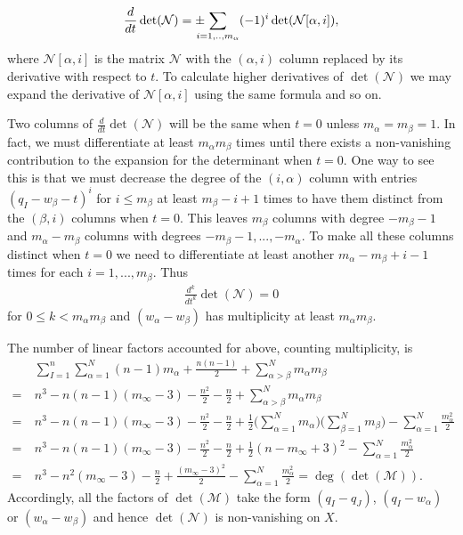 \documentclass[a4paper,12pt,reqno]{amsart}
\numberwithin{equation}{section}
\numberwithin{counter2}{section}
\begin{document}
\begin{align}
\frac{d}{dt}\det(\mathcal{N}) = \pm \hspace{-3mm} \sum_{i = 1,..,m_\alpha} (-1)^i \det(\mathcal{N}{[\alpha,i]}),  
\end{align}
where $\mathcal{N}{[\alpha,i]}$ is the matrix $\mathcal{N}$ with the $(\alpha,i)$ column replaced by its derivative with respect to $t$.  To calculate higher derivatives of $\det(\mathcal{N})$ we may expand the derivative of $\mathcal{N}{[\alpha,i]}$ using the same formula and so on.  \par 
Two columns of $\frac{d}{dt}\det(\mathcal{N})$ will be the same when $t = 0$ unless $m_\alpha = m_\beta = 1$.  In fact,  we must differentiate at least $m_\alpha m_\beta$ times until there exists a non-vanishing contribution to the expansion for the determinant when $t = 0$.  One way to see this is that we must decrease the degree of the $(i,\alpha)$ column with entries $(q_I - w_\beta - t)^i$ for $i \le m_\beta$ at least $m_\beta - i + 1$ times to have them distinct from the $(\beta,i)$ columns when $t = 0$.  This leaves $m_\beta$ columns with degree $-m_\beta - 1$ and $m_\alpha - m_\beta$ columns with degrees $-m_\beta - 1,...,-m_\alpha$.  To make all these columns distinct when $t = 0$ we need to differentiate at least another $m_\alpha - m_\beta + i - 1$ times for each $i = 1,...,m_\beta$.  Thus
\begin{align}
\frac{d^k}{dt^k}\det(\mathcal{N}) = 0
\end{align}
for $0 \le k < m_\alpha m_\beta$ and $(w_\alpha - w_\beta)$ has multiplicity at least $m_\alpha m_\beta$.   \par 
The number of linear factors accounted for above,  counting multiplicity,  is 
\begin{align}
&\sum_{I = 1}^{n} \sum_{\alpha = 1}^{N} (n-1)m_\alpha + \frac{n(n-1)}{2} + \sum_{\alpha > \beta}^{N} m_\alpha m_\beta\nonumber  \\ \nonumber = \ &n^3 - n(n-1)(m_\infty - 3)- \frac{n^2}{2} - \frac{n}{2} + \sum_{\alpha > \beta}^{N} m_\alpha m_\beta \\ = \ &n^3 - n(n-1)(m_\infty - 3)- \frac{n^2}{2} - \frac{n}{2} + \frac{1}{2} \Bigg( \sum_{\alpha = 1}^N m_\alpha \Bigg)\Bigg( \sum_{\beta = 1}^N m_\beta \Bigg) - \sum_{\alpha = 1}^{N} \frac{m_\alpha^2}{2}
\nonumber \\ = \ &n^3 - n(n-1)(m_\infty - 3)- \frac{n^2}{2} - \frac{n}{2} + \frac{1}{2}(n - m_\infty + 3)^2 -  \sum_{\alpha = 1}^{N}  \frac{m_\alpha^2}{2} \nonumber
\nonumber \\ = \ &n^3 - n^2(m_\infty - 3) - \frac{n}{2} + \frac{(m_\infty - 3)^2}{2} -  \sum_{\alpha = 1}^{N}  \frac{m_\alpha^2}{2} = \deg(\det(\mathcal{M})).  
\end{align} 
Accordingly,  all the factors of $\det(\mathcal{M})$ take the form $(q_I - q_J)$,  $(q_I - w_\alpha)$ or $(w_\alpha - w_\beta)$ and hence $\det(\mathcal{N})$ is non-vanishing on $X$.  
\end{document}
